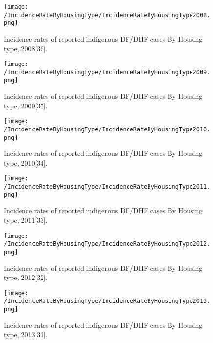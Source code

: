 \documentclass[11pt]{exam}
\begin{document}
\begin{questions}
\begin{enumerate}
\begin{figure}[H]
  \centering
   \texttt{[image: /IncidenceRateByHousingType/IncidenceRateByHousingType2008.png]} 
  \caption{Incidence rates of reported indigenous DF/DHF cases By Housing type, 2008[36].}
   \label{Incidence rate of indigenous DF/DHF cases by housing type.}
\end{figure} 

\begin{figure}[H]
  \centering
   \texttt{[image: /IncidenceRateByHousingType/IncidenceRateByHousingType2009.png]} 
  \caption{Incidence rates of reported indigenous DF/DHF cases By Housing type, 2009[35].}
   \label{Incidence rate of indigenous DF/DHF cases by housing type.}
\end{figure} 

\begin{figure}[H]
  \centering
   \texttt{[image: /IncidenceRateByHousingType/IncidenceRateByHousingType2010.png]} 
  \caption{Incidence rates of reported indigenous DF/DHF cases By Housing type, 2010[34].}
   \label{Incidence rate of indigenous DF/DHF cases by housing type.}
\end{figure} 

\begin{figure}[H]
  \centering
   \texttt{[image: /IncidenceRateByHousingType/IncidenceRateByHousingType2011.png]} 
  \caption{Incidence rates of reported indigenous DF/DHF cases By Housing type, 2011[33].}
   \label{Incidence rate of indigenous DF/DHF cases by housing type.}
\end{figure} 

\begin{figure}[H]
  \centering
   \texttt{[image: /IncidenceRateByHousingType/IncidenceRateByHousingType2012.png]} 
  \caption{Incidence rates of reported indigenous DF/DHF cases By Housing type, 2012[32].}
   \label{Incidence rate of indigenous DF/DHF cases by housing type.}
\end{figure} 

\begin{figure}[H]
  \centering
   \texttt{[image: /IncidenceRateByHousingType/IncidenceRateByHousingType2013.png]} 
  \caption{Incidence rates of reported indigenous DF/DHF cases By Housing type, 2013[31].}
   \label{Incidence rate of indigenous DF/DHF cases by housing type.}
\end{figure} 


\end{enumerate}
\end{questions}
\end{document}
